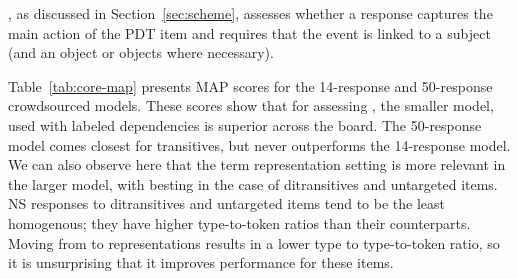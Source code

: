 , as discussed in Section~\ref{sec:scheme}, assesses whether a response captures the main action of the PDT item and requires that the event is linked to a subject (and an object or objects where necessary).

Table~\ref{tab:core-map} presents  MAP scores for the 14-response and 50-response crowdsourced models. These scores show that for assessing , the smaller model, used with labeled dependencies is superior across the board. The 50-response model comes closest for transitives, but never outperforms the 14-response model. We can also observe here that the term representation setting is more relevant in the larger model, with  besting  in the case of ditransitives and untargeted items. NS responses to ditransitives and untargeted items tend to  be the least homogenous; they have higher type-to-token ratios  than their counterparts. Moving from  to  representations results in a lower type to type-to-token ratio, so it is unsurprising that it improves performance for these items.

